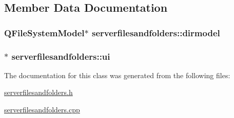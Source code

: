 \subsection{Member Data Documentation}
\hypertarget{classserverfilesandfolders_ab95bcb566830347d44645fa00ba78b80}{
\subsubsection[{dirmodel}]{\setlength{\rightskip}{0pt plus 5cm}Q\-File\-System\-Model$\ast$ serverfilesandfolders\-::dirmodel\hspace{0.3cm}{\ttfamily [private]}}}\label{classserverfilesandfolders_ab95bcb566830347d44645fa00ba78b80}
\hypertarget{classserverfilesandfolders_ad4869db2d9cec9cc8703f75471a3067b}{
\subsubsection[{ui}]{$\ast$ serverfilesandfolders\-::ui\hspace{0.3cm}{\ttfamily [private]}}}\label{classserverfilesandfolders_ad4869db2d9cec9cc8703f75471a3067b}


The documentation for this class was generated from the following files\-:\begin{DoxyCompactItemize}
\item 
\hyperlink{serverfilesandfolders_8h}{serverfilesandfolders.\-h}\item 
\hyperlink{serverfilesandfolders_8cpp}{serverfilesandfolders.\-cpp}\end{DoxyCompactItemize}
